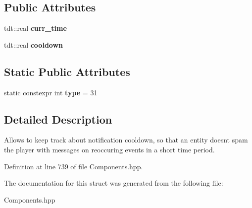 \subsection*{Public Attributes}
\begin{DoxyCompactItemize}
\item 
tdt\+::real {\bfseries curr\+\_\+time}\hypertarget{struct_notification_component_a25bd9b213ce69c1a116172bf1260a297}{}\label{struct_notification_component_a25bd9b213ce69c1a116172bf1260a297}

\item 
tdt\+::real {\bfseries cooldown}\hypertarget{struct_notification_component_ab1ea5364d5028d54fbd1cdf5665116c4}{}\label{struct_notification_component_ab1ea5364d5028d54fbd1cdf5665116c4}

\end{DoxyCompactItemize}
\subsection*{Static Public Attributes}
\begin{DoxyCompactItemize}
\item 
static constexpr int {\bfseries type} = 31\hypertarget{struct_notification_component_ab08b754bf71f34e51e2627f916e4bcbc}{}\label{struct_notification_component_ab08b754bf71f34e51e2627f916e4bcbc}

\end{DoxyCompactItemize}


\subsection{Detailed Description}
Allows to keep track about notification cooldown, so that an entity doesn\textquotesingle{}t spam the player with messages on reoccuring events in a short time period. 

Definition at line 739 of file Components.\+hpp.



The documentation for this struct was generated from the following file\+:\begin{DoxyCompactItemize}
\item 
Components.\+hpp\end{DoxyCompactItemize}
